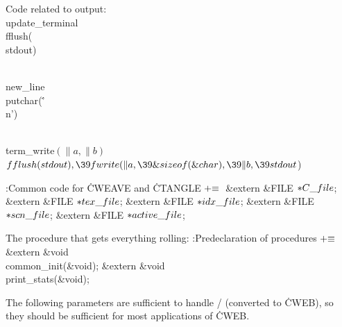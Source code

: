 Code related to output:
\Y\B\4\D\\{update\_terminal}\5
\\{fflush}(\\{stdout})\par
\B\4\D\\{new\_line}\5
\\{putchar}(\.{'\\n'})\par
\B\4\D\\{term\_write}$(\|a,\|b)$\5
$\\{fflush}(\\{stdout}),\39\\{fwrite}(\|a,\39\&{sizeof}(\&{char}),\39\|b,\39%
\\{stdout}{}$)\par
\Y\B\4:Common code for \.{CWEAVE} and \.{CTANGLE}\X${}\mathrel+\equiv{}$\6
\&{extern} \&{FILE} ${}{*}\\{C\_file}{}$;%
\6
\&{extern} \&{FILE} ${}{*}\\{tex\_file}{}$;\6
\&{extern} \&{FILE} ${}{*}\\{idx\_file}{}$;\6
\&{extern} \&{FILE} ${}{*}\\{scn\_file}{}$;\6
\&{extern} \&{FILE} ${}{*}\\{active\_file}{}$;\par
\fi

The procedure that gets everything rolling:
\Y\B\4:Predeclaration of procedures\X${}\mathrel+\equiv{}$\6
\&{extern} \&{void} \\{common\_init}(\&{void});\6
\&{extern} \&{void} \\{print\_stats}(\&{void});\par
\fi

The following parameters are sufficient to handle \TEX/ (converted to
\.{CWEB}), so they should be sufficient for most applications of \.{CWEB}.

